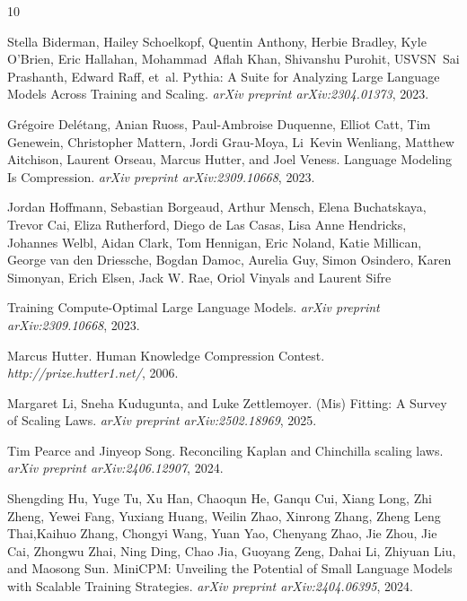 \documentclass[11pt]{article}
\begin{document}

\begin{thebibliography}{10}

Stella Biderman, Hailey Schoelkopf, Quentin Anthony, Herbie Bradley, Kyle O'Brien, Eric Hallahan, Mohammad~Aflah Khan, Shivanshu Purohit, USVSN~Sai Prashanth, Edward Raff, et~al.
\newblock Pythia: A Suite for Analyzing Large Language Models Across Training and Scaling.
\newblock \emph{arXiv preprint arXiv:2304.01373}, 2023.

Grégoire Delétang, Anian Ruoss, Paul-Ambroise Duquenne, Elliot Catt, Tim Genewein, Christopher Mattern, Jordi Grau-Moya, Li~Kevin Wenliang, Matthew Aitchison, Laurent Orseau, Marcus Hutter, and Joel Veness.
\newblock Language Modeling Is Compression.
\newblock \emph{arXiv preprint arXiv:2309.10668}, 2023.

Jordan Hoffmann, Sebastian Borgeaud, Arthur Mensch, Elena Buchatskaya, Trevor Cai, Eliza Rutherford, Diego de Las Casas, Lisa Anne Hendricks, Johannes Welbl, Aidan Clark, Tom Hennigan, Eric Noland, Katie Millican, George van den Driessche, Bogdan Damoc, Aurelia Guy, Simon Osindero, Karen Simonyan, Erich Elsen, Jack W. Rae, Oriol Vinyals and Laurent Sifre

\newblock Training Compute-Optimal Large Language Models.
\newblock \emph{arXiv preprint arXiv:2309.10668}, 2023.

Marcus Hutter.
\newblock Human Knowledge Compression Contest.
\newblock \emph{http://prize.hutter1.net/}, 2006.

Margaret Li, Sneha Kudugunta, and Luke Zettlemoyer.
\newblock (Mis) Fitting: A Survey of Scaling Laws.
\newblock \emph{arXiv preprint arXiv:2502.18969}, 2025.

Tim Pearce and Jinyeop Song.
\newblock Reconciling Kaplan and Chinchilla scaling laws.
\newblock \emph{arXiv preprint arXiv:2406.12907}, 2024.

Shengding Hu, Yuge Tu, Xu Han, Chaoqun He, Ganqu Cui, Xiang Long, Zhi Zheng, Yewei Fang, Yuxiang Huang, Weilin Zhao, Xinrong Zhang, Zheng Leng Thai,Kaihuo Zhang, Chongyi Wang, Yuan Yao, Chenyang Zhao, Jie Zhou, Jie Cai, Zhongwu Zhai, Ning Ding, Chao Jia, Guoyang Zeng, Dahai Li, Zhiyuan Liu, and Maosong Sun.
\newblock MiniCPM: Unveiling the Potential of Small Language Models with Scalable Training Strategies.
\newblock \emph{arXiv preprint arXiv:2404.06395}, 2024.


\end{thebibliography}
\end{document}
